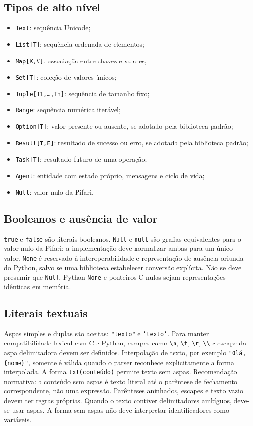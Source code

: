 \documentclass[12pt,a4paper]{article}
\begin{document}
\subsection{Tipos de alto nível}
\begin{itemize}
\item \texttt{Text}: sequência Unicode;
\item \texttt{List[T]}: sequência ordenada de elementos;
\item \texttt{Map[K,V]}: associação entre chaves e valores;
\item \texttt{Set[T]}: coleção de valores únicos;
\item \texttt{Tuple[T1,\ldots,Tn]}: sequência de tamanho fixo;
\item \texttt{Range}: sequência numérica iterável;
\item \texttt{Option[T]}: valor presente ou ausente, se adotado pela biblioteca padrão;
\item \texttt{Result[T,E]}: resultado de sucesso ou erro, se adotado pela biblioteca padrão;
\item \texttt{Task[T]}: resultado futuro de uma operação;
\item \texttt{Agent}: entidade com estado próprio, mensagens e ciclo de vida;
\item \texttt{Null}: valor nulo da Pifari.
\end{itemize}
\subsection{Booleanos e ausência de valor}
\texttt{true} e \texttt{false} são literais booleanos. \texttt{Null} e \texttt{null} são grafias equivalentes para o valor nulo da Pifari; a implementação deve normalizar ambas para um único valor. \texttt{None} é reservado à interoperabilidade e representação de ausência oriunda do Python, salvo se uma biblioteca estabelecer conversão explícita. Não se deve presumir que \texttt{Null}, Python \texttt{None} e ponteiros C nulos sejam representações idênticas em memória.
\subsection{Literais textuais}
Aspas simples e duplas são aceitas: \texttt{"texto"} e \texttt{'texto'}. Para manter compatibilidade lexical com C e Python, escapes como \texttt{\textbackslash n}, \texttt{\textbackslash t}, \texttt{\textbackslash r}, \texttt{\textbackslash\textbackslash} e escape da aspa delimitadora devem ser definidos. Interpolação de texto, por exemplo \texttt{"Olá, \{nome\}"}, somente é válida quando o parser reconhece explicitamente a forma interpolada.
A forma \texttt{txt(conteúdo)} permite texto sem aspas. Recomendação normativa: o conteúdo sem aspas é texto literal até o parêntese de fechamento correspondente, não uma expressão. Parênteses aninhados, escapes e texto vazio devem ter regras próprias. Quando o texto contiver delimitadores ambíguos, deve-se usar aspas. A forma sem aspas não deve interpretar identificadores como variáveis.
\end{document}
